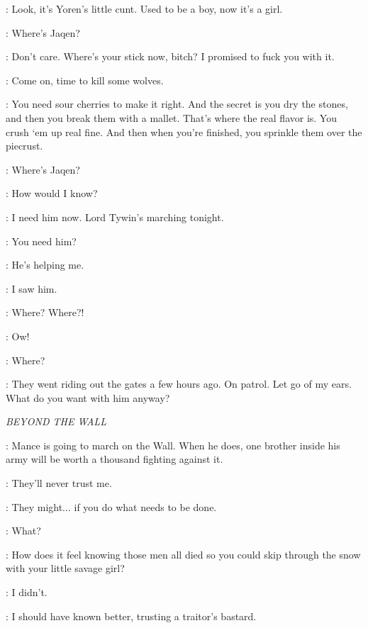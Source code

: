 \BITER: Look, it's Yoren's little cunt. Used to be a boy, now it's a girl. 

\ARYA: Where's Jaqen? 

\BITER: Don't care. Where's your stick now, bitch? I promised to fuck you with it. 

\GUARD:  Come on, time to kill some wolves. 


\HOTPIE: You need sour cherries to make it right. And the secret is you dry the stones, and then you break them with a mallet. That's where the real flavor is. You crush `em up real fine. And then when you're finished, you sprinkle them over the piecrust. 

\ARYA: Where's Jaqen? 

\GENDRY: How would I know? 

\ARYA: I need him now. Lord Tywin's marching tonight. 

\GENDRY: You need him? 

\ARYA: He's helping me. 

\HOTPIE: I saw him. 

\ARYA: Where? Where?! 


\HOTPIE: Ow! 

\ARYA: Where? 

\HOTPIE: They went riding out the gates a few hours ago. On patrol. Let go of my ears. What do you want with him anyway? 


\scene

\textit{BEYOND THE WALL} 


\HALFHAND: Mance is going to march on the Wall. When he does, one brother inside his army will be worth a thousand fighting against it. 

\JON: They'll never trust me. 

\HALFHAND: They might$\ldots$ if you do what needs to be done. 

\JON: What? 

\HALFHAND: How does it feel knowing those men all died so you could skip through the snow with your little savage girl? 

\JON: I didn't. 

\HALFHAND: I should have known better, trusting a traitor's bastard. 

